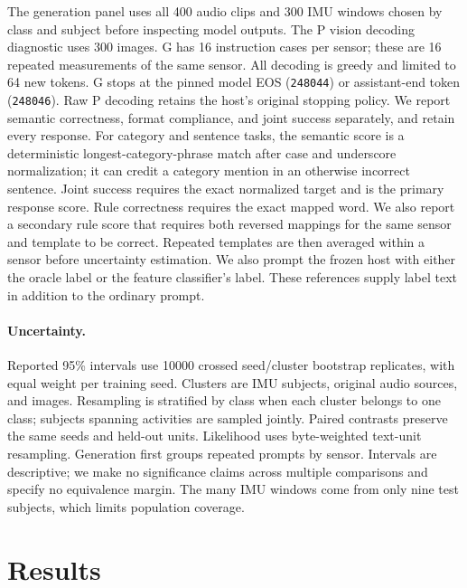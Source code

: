 \documentclass[11pt]{article}
\begin{document}
The generation panel uses all 400 audio clips and 300 IMU windows chosen by
class and subject before inspecting model outputs. The P vision decoding diagnostic uses
300 images. G has 16 instruction cases per sensor; these are 16 repeated
measurements of the same sensor. All decoding is greedy and limited to 64 new
tokens. G stops at the pinned model EOS (\texttt{248044}) or assistant-end
token (\texttt{248046}). Raw P decoding retains the host's original stopping
policy. We report semantic correctness, format compliance, and joint success
separately, and retain every response. For category and sentence tasks, the
semantic score is a deterministic longest-category-phrase match after case and
underscore normalization; it can credit a category mention in an otherwise
incorrect sentence. Joint success requires the exact normalized target and is
the primary response score. Rule correctness requires the exact mapped word.
We also report a secondary rule score that requires both reversed mappings for
the same sensor and template to be correct. Repeated templates are then
averaged within a sensor before uncertainty estimation.
We also prompt the frozen host with either the oracle label or the feature
classifier's label. These references supply label text in addition to the
ordinary prompt.

\paragraph{Uncertainty.}
Reported 95\% intervals use 10000 crossed seed/cluster bootstrap replicates,
with equal weight per training seed. Clusters are IMU subjects, original audio
sources, and images. Resampling is stratified by class when each cluster
belongs to one class; subjects spanning activities are sampled jointly.
Paired contrasts preserve the same seeds and held-out units. Likelihood uses
byte-weighted text-unit resampling. Generation first groups repeated prompts
by sensor. Intervals are descriptive; we make no significance claims across multiple
comparisons and specify no equivalence margin. The many IMU windows come from
only nine test subjects, which limits population coverage.

\section{Results}

\end{document}
